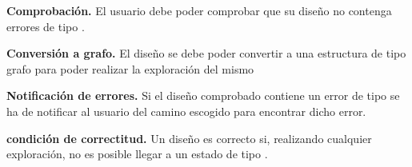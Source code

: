	\item \textbf{Comprobación.}\newline
		El usuario debe poder comprobar que su diseño no contenga errores de tipo \textit{}.
		\begin{functional}
			\item \textbf{Conversión a grafo.}\newline
				El diseño se debe poder convertir a una estructura de tipo grafo para poder realizar la exploración del mismo
			\item \textbf{Notificación de errores.}\newline
				Si el diseño comprobado contiene un error de tipo \textit{} se ha de notificar al usuario del camino escogido para encontrar dicho error.
			\item \textbf{condición de correctitud.}\newline
				Un diseño es correcto si, realizando cualquier exploración, no es posible llegar a un estado de tipo \textit{}.
		\end{functional}
